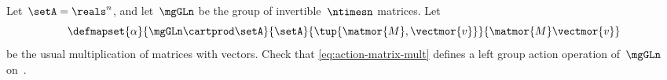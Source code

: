 

\begin{gradedexercise}
    \label{ex:MatrixMultAction}
    Let~$\setA = \reals^n$, and let~$\mgGLn$ be the group of invertible~$\ntimesn$ matrices.
    Let
    \begin{equation}
        \label{eq:action-matrix-mult}
        \defmapset{
            \alpha
        }{
            \mgGLn \cartprod \setA
        }{
            \setA
        }{
            \tup{\matmor{M}, \vectmor{v}}
        }{
            \matmor{M}\vectmor{v}
        }
    \end{equation}
    be the usual multiplication of matrices with vectors.
    Check that \cref{eq:action-matrix-mult} defines a left group action operation of~$\mgGLn$ on~\setA.
\end{gradedexercise}




